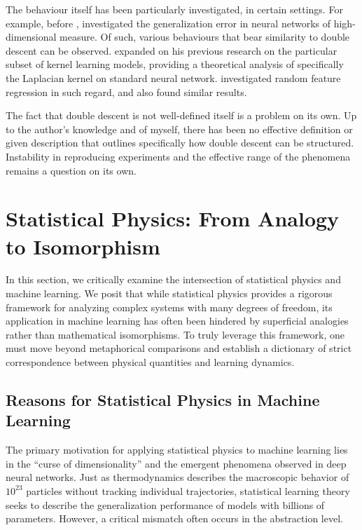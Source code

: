 \documentclass[
  journal=largetwo,
  year=2025,
  volume=37,
]{cup-journal}
\begin{document}
The behaviour itself has been particularly investigated, in certain settings. For example, before \cite{belkin_reconciling_2019}, \cite{advani2017highdimensionaldynamicsgeneralizationerror} investigated the generalization error in neural networks of high-dimensional measure. Of such, various behaviours that bear similarity to double descent can be observed. \cite{belkin2018understanddeeplearningneed} expanded on his previous research on the particular subset of kernel learning models, providing a theoretical analysis of specifically the Laplacian kernel on standard neural network. \cite{mei2020generalizationerrorrandomfeatures} investigated random feature regression in such regard, and also found similar results. 

The fact that double descent is not well-defined itself is a problem on its own. Up to the author's knowledge and of myself, there has been no effective definition or given description that outlines specifically how double descent can be structured. Instability in reproducing experiments and the effective range of the phenomena remains a question on its own. 

\section{Statistical Physics: From Analogy to Isomorphism}

In this section, we critically examine the intersection of statistical physics and machine learning. We posit that while statistical physics provides a rigorous framework for analyzing complex systems with many degrees of freedom, its application in machine learning has often been hindered by superficial analogies rather than mathematical isomorphisms. To truly leverage this framework, one must move beyond metaphorical comparisons and establish a dictionary of strict correspondence between physical quantities and learning dynamics.

\subsection{Reasons for Statistical Physics in Machine Learning}

The primary motivation for applying statistical physics to machine learning lies in the ``curse of dimensionality'' and the emergent phenomena observed in deep neural networks. Just as thermodynamics describes the macroscopic behavior of $10^{23}$ particles without tracking individual trajectories, statistical learning theory seeks to describe the generalization performance of models with billions of parameters. However, a critical mismatch often occurs in the abstraction level.
\end{document}
